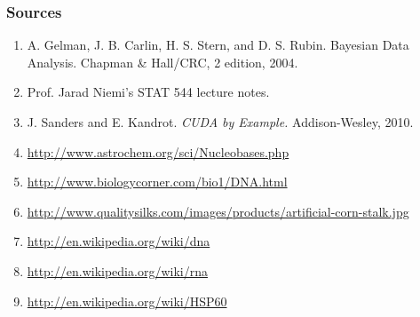 \documentclass[handout]{beamer}
\numberwithin{equation}{section}
\begin{document}
\begin{frame}
\frametitle{Sources}
\begin{enumerate}[1. ]
\item A. Gelman, J. B. Carlin, H. S. Stern, and D. S. Rubin. Bayesian Data Analysis. Chapman \& Hall/CRC, 2 edition, 2004.
\item Prof. Jarad Niemi's STAT 544 lecture notes.
\item J. Sanders and E. Kandrot. \emph{CUDA by Example.} Addison-Wesley, 2010.
\item \url{http://www.astrochem.org/sci/Nucleobases.php}
\item \url{http://www.biologycorner.com/bio1/DNA.html}
\item \url{http://www.qualitysilks.com/images/products/artificial-corn-stalk.jpg}
\item \url{http://en.wikipedia.org/wiki/dna}
\item \url{http://en.wikipedia.org/wiki/rna}
\item \url{http://en.wikipedia.org/wiki/HSP60}
\end{enumerate}
\end{frame}
\end{document}
